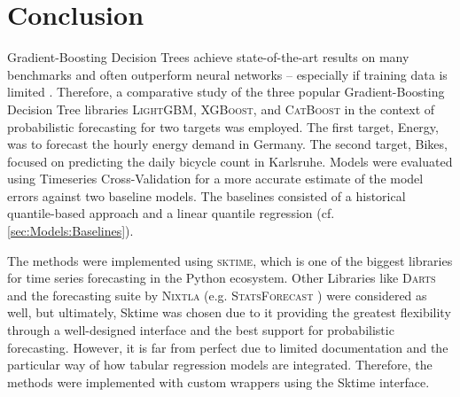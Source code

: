 \newpage
\section{Conclusion}
\label{ch:Conclusion}

Gradient-Boosting Decision Trees achieve state-of-the-art results on many benchmarks and often outperform neural networks -- especially if training data is limited \parencites{shwartz-ziv_tabular_2021, grinsztajn_why_2022}. Therefore, a comparative study of the three popular Gradient-Boosting Decision Tree libraries \textsc{LightGBM}, \textsc{XGBoost}, and \textsc{CatBoost} in the context of probabilistic forecasting for two targets was employed. The first target, Energy, was to forecast the hourly energy demand in Germany. The second target, Bikes, focused on predicting the daily bicycle count in Karlsruhe. Models were evaluated using Timeseries Cross-Validation for a more accurate estimate of the model errors against two baseline models. The baselines consisted of a historical quantile-based approach and a linear quantile regression (cf. \cref{sec:Models:Baselines}).

The methods were implemented using \textsc{sktime}, which is one of the biggest libraries for time series forecasting in the Python ecosystem. Other Libraries like \textsc{Darts} \parencite{herzen_darts_2022} and the forecasting suite by \textsc{Nixtla} (e.g. \textsc{StatsForecast} \parencite{azul_garza_statsforecast_2022}) were considered as well, but ultimately, Sktime was chosen due to it providing the greatest flexibility through a well-designed interface and the best support for probabilistic forecasting. However, it is far from perfect due to limited documentation and the particular way of how tabular regression models are integrated. Therefore, the methods were implemented with custom wrappers using the Sktime interface.

